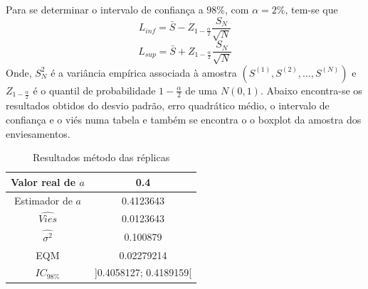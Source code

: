 \documentclass[letterpaper,11pt]{article}
\begin{document}
\begin{enumerate}
Para se determinar o intervalo de confiança a $98\%$, com $\alpha = 2\%$, tem-se que $$L_{inf} = \bar{S} - Z_{1-\frac{\alpha}{2}} \frac{S_N}{\sqrt{N}}$$
$$L_{sup} = \bar{S} + Z_{1-\frac{\alpha}{2}} \frac{S_N}{\sqrt{N}}$$
Onde, $S_{N}^2$ é a variância empírica associada à amostra $(S^{(1)},S^{(2)}, \dots ,S^{(N)})$ e $Z_{1-\frac{\alpha}{2}}$ é o quantil de probabilidade $1-\frac{\alpha}{2}$ de uma $N(0,1)$.
Abaixo encontra-se os resultados obtidos do desvio padrão, erro quadrático médio, o intervalo de confiança e o viés numa tabela e também se encontra o o boxplot da amostra dos enviesamentos.
\begin{table}[H]
\begin{center}
\begin{tabular}{|c| c|} 
\hline
Valor real de $a$ & 0.4 \\
\hline
Estimador de $a$ & 0.4123643 \\ 
\hline
$\hat{Vies}$ & 0.0123643 \\
\hline
$\hat{\sigma^2}$ & 0.100879\\
\hline
EQM &  0.02279214 \\
\hline
$IC_{98\%}$ & ]0.4058127; 0.4189159[ \\
\hline
\end{tabular}
\caption{Resultados método das réplicas}
\end{center}
\end{table}


\end{enumerate}
\end{document}
